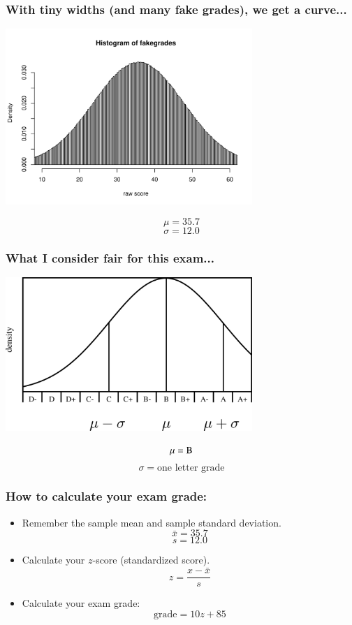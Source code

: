 \begin{frame}
\begin{center}
\frametitle{With tiny widths (and many fake grades), we get a curve...}
\includegraphics[width=0.7\textwidth]{3-1_normal_distribution/figures/grades/fakegrades5.pdf}
\end{center}
$$\mu = 35.7$$
$$\sigma=12.0$$
\end{frame}


\begin{frame}
\begin{center}
\frametitle{What I consider fair for this exam...}
\includegraphics[width=0.7\textwidth]{3-1_normal_distribution/figures/grades/curve.png}
\end{center}
$$\mu = \rm{B}$$
$$\sigma= \text{one letter grade}$$
\end{frame}

\begin{frame}
\frametitle{How to calculate your exam grade:}
\begin{itemize}
\item Remember the sample mean and sample standard deviation.
$$\bar{x} = 35.7 $$
$$s = 12.0 $$
\item Calculate your $z$-score (standardized score).
 $$z = \frac{x-\bar{x}}{s} $$
\item Calculate your exam grade:
$$\text{grade} = 10z+85 $$
\end{itemize}
\end{frame}

